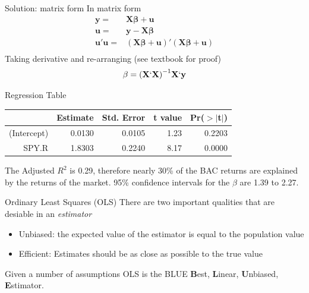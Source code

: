 \documentclass[14pt,xcolor=pdftex,dvipsnames,table]{beamer}\usepackage[]{graphicx}\usepackage[]{color}
\begin{document}
\begin{frame}{Solution: matrix form}
In matrix form
\begin{align*}
\mathbf{y} =& \mathbf{X \beta} + \mathbf{u}\\
\mathbf{u} =& \mathbf{y} - \mathbf{X\beta}\\
\mathbf{u}' \mathbf{u} =& (\mathbf{X \beta} + \mathbf{u})'(\mathbf{X \beta} + \mathbf{u})\\ 
\end{align*}
Taking derivative and re-arranging (see textbook for proof)
\begin{align*}
\mathbf{\beta} = \mathbf{(X`X)}^{-1}\mathbf{X`y}
\end{align*}
\end{frame}

\begin{frame}{Regression Table}
\begin{table}[ht]
\centering
\begin{tabular}{rrrrr}
  \hline
 & Estimate & Std. Error & t value & Pr($>$$|$t$|$) \\ 
  \hline
(Intercept) & 0.0130 & 0.0105 & 1.23 & 0.2203 \\ 
  SPY.R & 1.8303 & 0.2240 & 8.17 & 0.0000 \\ 
   \hline
\end{tabular}
\end{table}
The Adjusted $R^2$ is 0.29, therefore nearly 30\% of the BAC returns are explained by the returns of the market.  95\% confidence intervals for the $\beta$ are 1.39 to 2.27. 
\end{frame}


\begin{frame}{Ordinary Least Squares (OLS)}
There are two important qualities that are desiable in an \emph{estimator}
\begin{itemize}[<+-| alert@+>]
\item Unbiased:  the expected value of the estimator is equal to the population value
\item Efficient: Estimates should be as close as possible to the true value 
\end{itemize}
\pause
Given a number of assumptions OLS is the BLUE \textbf{B}est, \textbf{L}inear, \textbf{U}nbiased, \textbf{E}stimator.   
\end{frame}
\end{document}
